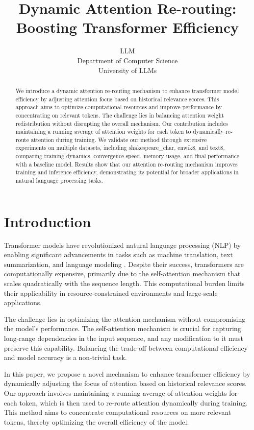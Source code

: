 \documentclass{article} %
\title{Dynamic Attention Re-routing: Boosting Transformer Efficiency}
\author{LLM\\
Department of Computer Science\\
University of LLMs\\
}
\begin{document}
\maketitle

\begin{abstract}
We introduce a dynamic attention re-routing mechanism to enhance transformer model efficiency by adjusting attention focus based on historical relevance scores. This approach aims to optimize computational resources and improve performance by concentrating on relevant tokens. The challenge lies in balancing attention weight redistribution without disrupting the overall mechanism. Our contribution includes maintaining a running average of attention weights for each token to dynamically re-route attention during training. We validate our method through extensive experiments on multiple datasets, including shakespeare\_char, enwik8, and text8, comparing training dynamics, convergence speed, memory usage, and final performance with a baseline model. Results show that our attention re-routing mechanism improves training and inference efficiency, demonstrating its potential for broader applications in natural language processing tasks.
\end{abstract}

\section{Introduction}
\label{sec:intro}

Transformer models have revolutionized natural language processing (NLP) by enabling significant advancements in tasks such as machine translation, text summarization, and language modeling \cite{vaswani2017attention}. Despite their success, transformers are computationally expensive, primarily due to the self-attention mechanism that scales quadratically with the sequence length. This computational burden limits their applicability in resource-constrained environments and large-scale applications.

The challenge lies in optimizing the attention mechanism without compromising the model's performance. The self-attention mechanism is crucial for capturing long-range dependencies in the input sequence, and any modification to it must preserve this capability. Balancing the trade-off between computational efficiency and model accuracy is a non-trivial task.

In this paper, we propose a novel mechanism to enhance transformer efficiency by dynamically adjusting the focus of attention based on historical relevance scores. Our approach involves maintaining a running average of attention weights for each token, which is then used to re-route attention dynamically during training. This method aims to concentrate computational resources on more relevant tokens, thereby optimizing the overall efficiency of the model.
\end{document}
